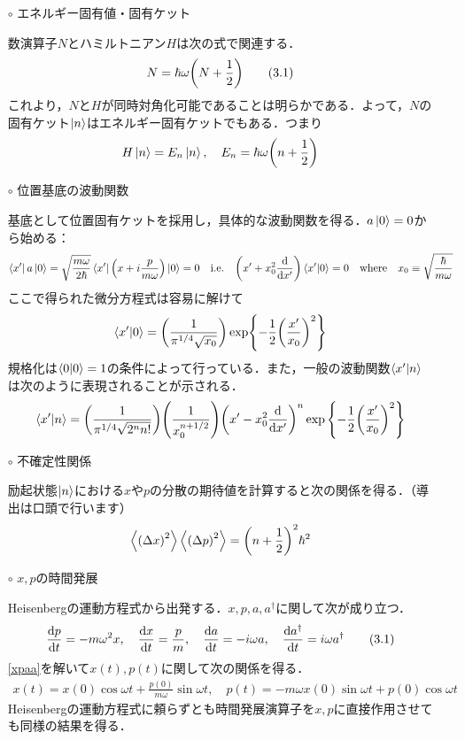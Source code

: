 \documentclass{jarticle}
\begin{document}
\begin{enumerate}
\begin{itemize}
  \item [$\circ$] エネルギー固有値・固有ケット

    数演算子$N$とハミルトニアン$H$は次の式で関連する．
    \begin{align}
      N = \hbar \omega \qty(N + \frac{1}{2}) \tag{3.1}
    \end{align}
    これより，$N$と$H$が同時対角化可能であることは明らかである．よって，$N$の固有ケット$\ket{n}$はエネルギー固有ケットでもある．つまり
    \begin{align}
      H\ket{n} = E_n\ket{n}, \quad E_n = \hbar \omega \qty(n + \frac{1}{2})
    \end{align}
  \item [$\circ$] 位置基底の波動関数

    基底として位置固有ケットを採用し，具体的な波動関数を得る．$a\ket{0} = 0$から始める：
    \begin{align}
      \bra{x'}a\ket{0} = \sqrt{\frac{m\omega}{2\hbar}} \bra{x'}\qty(x + i\frac{p}{m\omega})\ket{0} = 0 \quad \mathrm{i.e.} \quad \qty(x' + x_0^2\dv{x'})\bra{x'}\ket{0} = 0 \quad \mathrm{where} \quad x_0 \equiv \sqrt{\frac{\hbar}{m\omega}}
    \end{align}
    ここで得られた微分方程式は容易に解けて
    \begin{align}
      \bra{x'}\ket{0} = \qty(\frac{1}{\pi^{1/4}\sqrt{x_0}})\exp{-\frac{1}{2}\qty(\frac{x'}{x_0})^2}
    \end{align}
    規格化は$\bra{0}\ket{0} = 1$の条件によって行っている．また，一般の波動関数$\bra{x'}\ket{n}$は次のように表現されることが示される．
    \begin{align}
      \bra{x'}\ket{n} = \qty(\frac{1}{\pi^{1/4}\sqrt{2^nn!}})\qty(\frac{1}{x_0^{n + 1/2}})
      \qty(x' - x_0^2\dv{x'})^n \exp\qty{-\frac{1}{2}\qty(\frac{x'}{x_0})^2}
    \end{align}
  \item [$\circ$] 不確定性関係

    励起状態$\ket{n}$における$x$や$p$の分散の期待値を計算すると次の関係を得る．（導出は口頭で行います）
    \begin{align}
      \ev{\qty(\Delta x)^2}\ev{\qty(\Delta p)^2} = \qty(n + \frac{1}{2})^2\hbar^2
    \end{align}

  \item [$\circ$] $x, p$の時間発展

    Heisenbergの運動方程式から出発する．$x, p, a, a^\dagger$に関して次が成り立つ．
    \begin{align}
      \dv{p}{t} = -m\omega^2x, \quad \dv{x}{t} = \frac{p}{m}, \quad
      \dv{a}{t} = -i\omega a, \quad \dv{a^\dagger}{t} = i\omega a^\dagger  \tag{3.1} \label{xpaa}
    \end{align}
    \eqref{xpaa}を解いて$x(t), p(t)$に関して次の関係を得る．
    \begin{align}
      x(t) = x(0)\cos \omega t + \frac{p(0)}{m\omega}\sin \omega t, \quad
      p(t) = -m\omega x(0) \sin \omega t + p(0) \cos \omega t
    \end{align}
    Heisenbergの運動方程式に頼らずとも時間発展演算子を$x, p$に直接作用させても同様の結果を得る．
  \end{itemize}
\end{enumerate}
\end{document}
